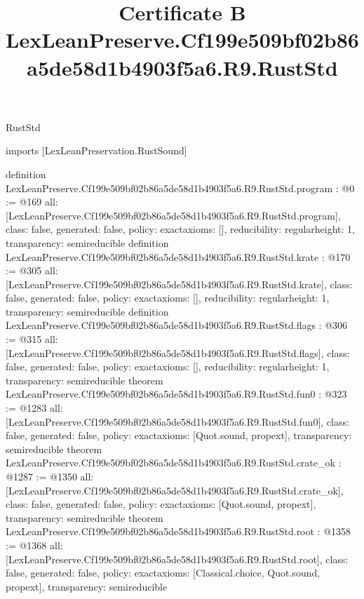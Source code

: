 \begin{lexlean}{RustStd}
\title{Certificate B LexLeanPreserve.Cf199e509bf02b86a5de58d1b4903f5a6.R9.RustStd}
\begin{coremodule}
imports [LexLeanPreservation.RustSound]

definition LexLeanPreserve.Cf199e509bf02b86a5de58d1b4903f5a6.R9.RustStd.program : @0 := @169 {
  all: [LexLeanPreserve.Cf199e509bf02b86a5de58d1b4903f5a6.R9.RustStd.program],
  class: false,
  generated: false,
  policy: exact{axioms: []},
  reducibility: regular{height: 1},
  transparency: semireducible
}
definition LexLeanPreserve.Cf199e509bf02b86a5de58d1b4903f5a6.R9.RustStd.krate : @170 := @305 {
  all: [LexLeanPreserve.Cf199e509bf02b86a5de58d1b4903f5a6.R9.RustStd.krate],
  class: false,
  generated: false,
  policy: exact{axioms: []},
  reducibility: regular{height: 1},
  transparency: semireducible
}
definition LexLeanPreserve.Cf199e509bf02b86a5de58d1b4903f5a6.R9.RustStd.flags : @306 := @315 {
  all: [LexLeanPreserve.Cf199e509bf02b86a5de58d1b4903f5a6.R9.RustStd.flags],
  class: false,
  generated: false,
  policy: exact{axioms: []},
  reducibility: regular{height: 1},
  transparency: semireducible
}
theorem LexLeanPreserve.Cf199e509bf02b86a5de58d1b4903f5a6.R9.RustStd.fun0 : @323 := @1283 {
  all: [LexLeanPreserve.Cf199e509bf02b86a5de58d1b4903f5a6.R9.RustStd.fun0],
  class: false,
  generated: false,
  policy: exact{axioms: [Quot.sound, propext]},
  transparency: semireducible
}
theorem LexLeanPreserve.Cf199e509bf02b86a5de58d1b4903f5a6.R9.RustStd.crate_ok : @1287 := @1350 {
  all: [LexLeanPreserve.Cf199e509bf02b86a5de58d1b4903f5a6.R9.RustStd.crate_ok],
  class: false,
  generated: false,
  policy: exact{axioms: [Quot.sound, propext]},
  transparency: semireducible
}
theorem LexLeanPreserve.Cf199e509bf02b86a5de58d1b4903f5a6.R9.RustStd.root : @1358 := @1368 {
  all: [LexLeanPreserve.Cf199e509bf02b86a5de58d1b4903f5a6.R9.RustStd.root],
  class: false,
  generated: false,
  policy: exact{axioms: [Classical.choice, Quot.sound, propext]},
  transparency: semireducible
}


\end{coremodule}
\end{lexlean}
